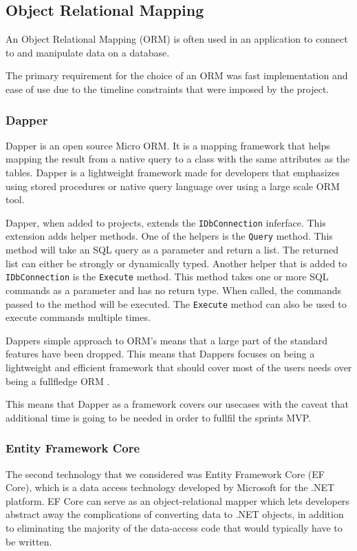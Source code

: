\subsection{Object Relational Mapping}
An Object Relational Mapping (ORM) is often used in an application to connect to and manipulate data on a database.

The primary requirement for the choice of an ORM was fast implementation and ease of use due to the timeline constraints that were imposed by the \knox{} project. 

\subsubsection{Dapper}
Dapper is an open source Micro ORM. It is a mapping framework that helps mapping the result from a native query to a class with the same attributes as the tables. Dapper is a lightweight framework made for developers that emphasizes using stored procedures or native query language over using a large scale ORM tool. 


Dapper, when added to projects, extends the \texttt{IDbConnection} inferface. This extension adds helper methods. 
One of the helpers is the \texttt{Query} method. This method will take an SQL query as a parameter and return a list. The returned list can either be strongly or dynamically typed.
Another helper that is added to \texttt{IDbConnection} is the \texttt{Execute} method. This method takes one or more SQL commands as a parameter and has no return type. When called, the commands passed to the method will be executed. The \texttt{Execute} method can also be used to execute commands multiple times\cite{Dapper_Git}.

Dappers simple approach to ORM's means that a large part of the standard features have been dropped. This means that Dappers focuses on being a lightweight and efficient framework that should cover most of the users needs over being a fullfledge ORM \cite{Dapper_Git}.

This means that Dapper as a framework covers our usecases with the caveat that additional time is going to be needed in order to fullfil the sprints MVP. 

\subsubsection{Entity Framework Core}
The second technology that we considered was Entity Framework Core (EF Core), which is a data access technology developed by Microsoft for the .NET platform. EF Core can serve as an object-relational mapper \cite{Object_relational_mapping} which lets developers abstract away the complications of converting data to .NET objects, in addition to eliminating the majority of the data-access code that would typically have to be written.

